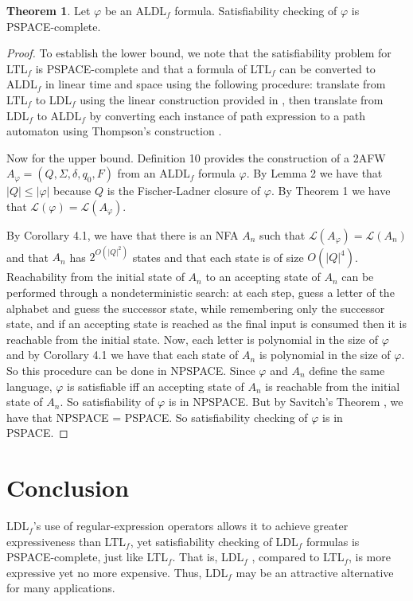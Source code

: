 \documentclass[10pt,a4paper]{amsart}
\theoremstyle{plain}
\theoremstyle{definition}
\newtheorem{theorem}[thm]{Theorem}
\theoremstyle{definition}
\DeclareMathOperator{\?}{?}
\begin{document}
\begin{theorem}
Let $\varphi$ be an ALDL$_f$ formula. Satisfiability checking of $\varphi$ is PSPACE-complete.
\end{theorem}

\begin{proof}
To establish the lower bound, we note that the satisfiability problem for LTL$_f$ is PSPACE-complete and that a formula of LTL$_f$ can be converted to ALDL$_f$ in linear time and space using the following procedure: translate from LTL$_f$ to LDL$_f$ using the linear construction provided in \cite{ldlf}, then translate from LDL$_f$ to ALDL$_f$ by converting each instance of path expression to a path automaton using Thompson's construction \cite{thompson}.

Now for the upper bound. Definition 10 provides the construction of a 2AFW $A_{\varphi} = (Q, \Sigma, \delta, q_0, F)$ from an ALDL$_f$ formula $\varphi$. By Lemma 2 we have that $|Q| \leq |\varphi|$ because $Q$ is the Fischer-Ladner closure of $\varphi$. By Theorem 1 we have that $\mathcal{L}(\varphi) = \mathcal{L}(A_\varphi)$.

By Corollary 4.1, we have that there is an NFA $A_n$ such that $\mathcal{L}(A_{\varphi}) = \mathcal{L}(A_n)$ and that $A_n$ has $2^{O(|Q|^2)}$ states and that each state is of size $O(|Q|^4)$. Reachability from the initial state of $A_n$ to an accepting state of $A_n$ can be performed through a nondeterministic search: at each step, guess a letter of the alphabet and guess the successor state, while remembering only the successor state, and if an accepting state is reached as the final input is consumed then it is reachable from the initial state. Now, each letter is polynomial in the size of $\varphi$ and by Corollary 4.1 we have that each state of $A_n$ is polynomial in the size of $\varphi$. So this procedure can be done in NPSPACE. Since $\varphi$ and $A_n$ define the same language, $\varphi$ is satisfiable iff an accepting state of $A_n$ is reachable from the initial state of $A_n$. So satisfiability of $\varphi$ is in NPSPACE. But by Savitch's Theorem \cite{savitch}, we have that NPSPACE = PSPACE. So satisfiability checking of $\varphi$ is in PSPACE.
\end{proof}

\section{Conclusion}

LDL$_f$'s use of regular-expression operators allows it to achieve greater expressiveness than LTL$_f$, yet satisfiability checking of LDL$_f$ formulas is PSPACE-complete, just like LTL$_f$. That is,  LDL$_f$ , compared to LTL$_f$, is more expressive yet no more expensive. Thus, LDL$_f$ may be an attractive alternative for many applications.
\end{document}

